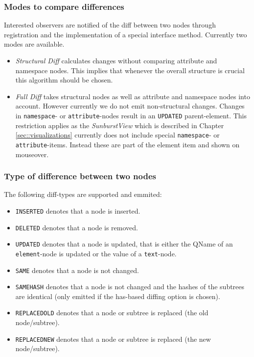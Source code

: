 \subsubsection{Modes to compare differences} Interested observers are notified of the diff between two nodes through registration and the implementation of a special interface method. Currently two modes are available.

\begin{itemize}
\item \emph{Structural Diff} calculates changes without comparing attribute and namespace nodes. This implies that whenever the overall structure is crucial this algorithm should be chosen.
\item \emph{Full Diff} takes structural nodes as well as attribute and namespace nodes into account. However currently we do not emit non-structural changes. Changes in \texttt{namespace}- or \texttt{attribute}-nodes result in an \texttt{UPDATED} parent-element. This restriction applies as the \emph{SunburstView} which is described in Chapter \ref{sec::visualizations} currently does not include special \texttt{namespace}- or \texttt{attribute}-items. Instead these are part of the element item and shown on mouseover.
\end{itemize}

\subsubsection{Type of difference between two nodes} The following diff-types are supported and emmited:

\begin{itemize}
\item \texttt{INSERTED} denotes that a node is inserted.
\item \texttt{DELETED} denotes that a node is removed.
\item \texttt{UPDATED} denotes that a node is updated, that is either the QName of an \texttt{element}-node is updated or the value of a \texttt{text}-node.
\item \texttt{SAME} denotes that a node is not changed.
\item \texttt{SAMEHASH} denotes that a node is not changed and the hashes of the subtrees are identical (only emitted if the has-based diffing option is chosen).
\item \texttt{REPLACEDOLD} denotes that a node or subtree is replaced (the old node/subtree).
\item \texttt{REPLACEDNEW} denotes that a node or subtree is replaced (the new node/subtree).
\end{itemize}

